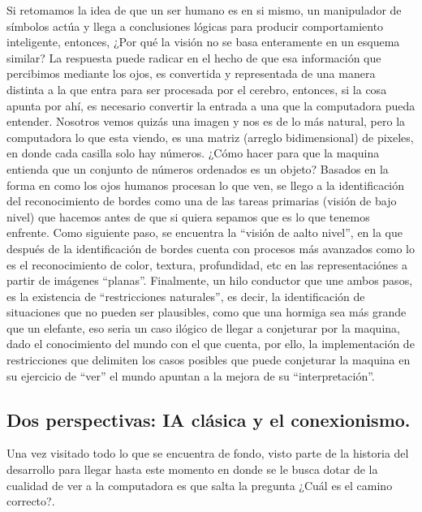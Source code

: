 \documentclass[11pt, letterpaper]{article}
\begin{document}
Si retomamos la idea de que un ser humano es en si mismo, un manipulador de símbolos actúa y llega a conclusiones lógicas para producir comportamiento inteligente, entonces, ¿Por qué la visión no se basa enteramente en un esquema similar? La respuesta puede radicar en el hecho de que esa información que percibimos mediante los ojos, es convertida y representada de una manera distinta a la que entra para ser procesada por el cerebro, entonces, si la cosa apunta por ahí, es necesario convertir la entrada a una que la computadora pueda entender. Nosotros vemos quizás una imagen y nos es de lo más natural, pero la computadora lo que esta viendo, es una matriz (arreglo bidimensional) de pixeles, en donde cada casilla solo hay números. ¿Cómo hacer para que la maquina entienda que un conjunto de números ordenados es un objeto?
Basados en la forma en como los ojos humanos procesan lo que ven, se llego a la identificación del reconocimiento de bordes como una de las tareas primarias (visión de bajo nivel) que hacemos antes de que si quiera sepamos que es lo que tenemos enfrente.
Como siguiente paso, se encuentra la “visión de aalto nivel”, en la que después de la identificación de bordes cuenta con procesos más avanzados como lo es el reconocimiento de color, textura, profundidad, etc en las representaciónes a partir de imágenes “planas”.
Finalmente, un hilo conductor que une ambos pasos, es la existencia de “restricciones naturales”, es decir, la identificación de situaciones que no pueden ser plausibles, como que una hormiga sea más grande que un elefante, eso seria un caso ilógico de llegar a conjeturar por la maquina, dado el conocimiento del mundo con el que cuenta, por ello, la implementación de restricciones que delimiten los casos posibles que puede conjeturar la maquina en su ejercicio de “ver” el mundo apuntan a la mejora de su “interpretación”.


\subsection{Dos perspectivas: IA clásica y el conexionismo.}

Una vez visitado todo lo que se encuentra de fondo, visto parte de la historia del desarrollo para llegar hasta este momento en donde se le busca dotar de la cualidad de ver a la computadora es que salta la pregunta ¿Cuál es el camino correcto?.
\end{document}
